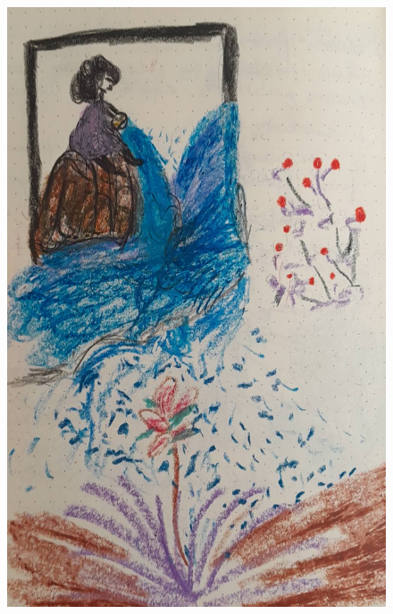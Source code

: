 \documentclass[12pt, a4paper, twoside]{book} %
\begin{document}
\begin{figure}[H]
	\centering
	\includegraphics[width=\textwidth]{./images/1f81324dd8c5d0.jpg}
\end{figure}
\end{document}

